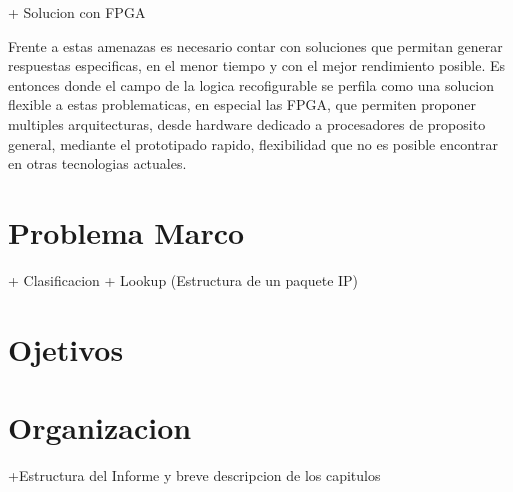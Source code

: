 + Solucion con FPGA

Frente a estas amenazas es necesario contar con soluciones que permitan generar respuestas especificas, en el menor tiempo y con el mejor rendimiento posible. Es entonces donde el campo de la logica recofigurable se perfila como una solucion flexible a estas problematicas, en especial las FPGA, que permiten proponer multiples arquitecturas, desde hardware dedicado a procesadores de proposito general, mediante el prototipado rapido, flexibilidad que no es posible encontrar en otras tecnologias actuales.

\section{Problema Marco}

+ Clasificacion
+ Lookup (Estructura de un paquete IP)

\section{Ojetivos}
\section{Organizacion}
+Estructura del Informe y breve descripcion de los capitulos





